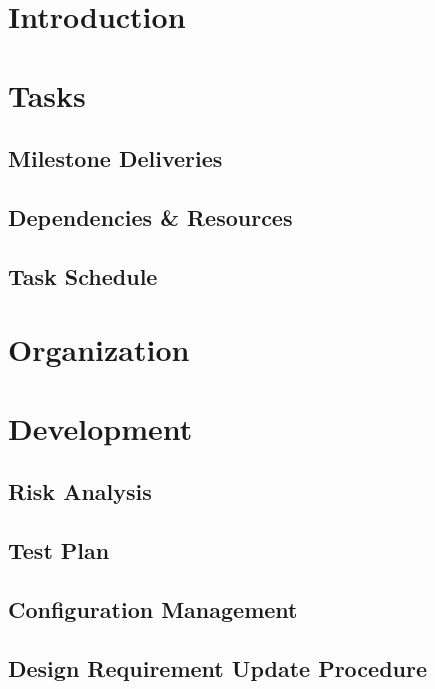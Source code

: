 \documentclass[12pt,titlepage]{article}
\begin{document}
\section{Introduction}

\section{Tasks}

\subsection{Milestone Deliveries}

\subsection{Dependencies \& Resources}

\subsection{Task Schedule}

\section{Organization}

\section{Development}

\subsection{Risk Analysis}

\subsection{Test Plan}

\subsection{Configuration Management}

\subsection{Design Requirement Update Procedure}
\end{document}
